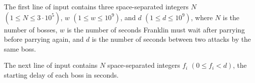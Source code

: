 
The first line of input contains three space-separated integers $N$ $(1 \leq N \leq 3 \cdot 10^{5})$, $w$ $(1 \leq w \leq 10^{9})$, and $d$ $(1 \leq d \leq 10^{9})$, where $N$ is the number of bosses, $w$ is the number of seconds Franklin must wait after parrying before parrying again, and $d$ is the number of seconds between two attacks by the same boss.

The next line of input contains $N$ space-separated integers $f_i$ $(0 \leq f_i < d)$, the starting delay of each boss in seconds.

